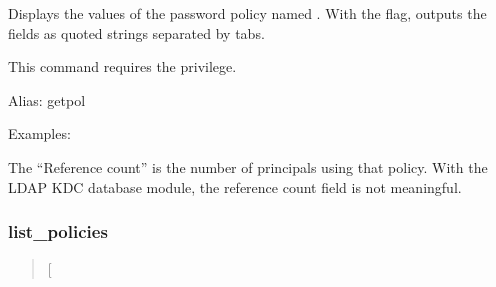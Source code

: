 \documentclass[letterpaper,10pt,english]{sphinxmanual}
\begin{document}
Displays the values of the password policy named .  With the
 flag, outputs the fields as quoted strings separated by
tabs.

This command requires the  privilege.

Alias: getpol

Examples:

%
\begin{sphinxVerbatim}[commandchars=\\\{\}]
  
 
     
   
   
      
     
  

   
                       
\end{sphinxVerbatim}

The “Reference count” is the number of principals using that policy.
With the LDAP KDC database module, the reference count field is not
meaningful.

\label{\detokenize{admin/admin_commands/kadmin_local:get-policy-end}}

\subsubsection{list\_policies}
\label{\detokenize{admin/admin_commands/kadmin_local:get-policy-end}}\label{\detokenize{admin/admin_commands/kadmin_local:list-policies}}\label{\detokenize{admin/admin_commands/kadmin_local:id16}}\begin{quote}

 {[}\sphinxstyleemphasis{expression}{]}
\end{quote}
\end{document}
